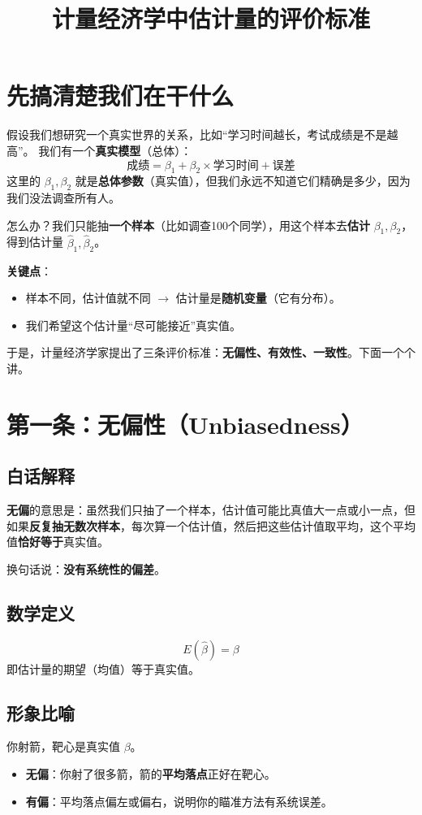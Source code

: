 \documentclass[a4paper,12pt]{article}
\title{计量经济学中估计量的评价标准}
\author{}
\date{}
\begin{document}
\maketitle

\section{先搞清楚我们在干什么}

假设我们想研究一个真实世界的关系，比如“学习时间越长，考试成绩是不是越高”。  
我们有一个\textbf{真实模型}（总体）：
\[
\text{成绩} = \beta_1 + \beta_2 \times \text{学习时间} + \text{误差}
\]
这里的 \(\beta_1, \beta_2\) 就是\textbf{总体参数}（真实值），但我们永远不知道它们精确是多少，因为我们没法调查所有人。

怎么办？我们只能抽\textbf{一个样本}（比如调查100个同学），用这个样本去\textbf{估计} \(\beta_1, \beta_2\)，得到估计量 \(\hat{\beta}_1, \hat{\beta}_2\)。

\textbf{关键点}：  
\begin{itemize}
    \item 样本不同，估计值就不同 $\rightarrow$ 估计量是\textbf{随机变量}（它有分布）。  
    \item 我们希望这个估计量“尽可能接近”真实值。
\end{itemize}

于是，计量经济学家提出了三条评价标准：\textbf{无偏性、有效性、一致性}。下面一个个讲。

\section{第一条：无偏性（Unbiasedness）}

\subsection*{白话解释}
\textbf{无偏}的意思是：虽然我们只抽了一个样本，估计值可能比真值大一点或小一点，但如果\textbf{反复抽无数次样本}，每次算一个估计值，然后把这些估计值取平均，这个平均值\textbf{恰好等于}真实值。

换句话说：\textbf{没有系统性的偏差}。

\subsection*{数学定义}
\[
E(\hat{\beta}) = \beta
\]
即估计量的期望（均值）等于真实值。

\subsection*{形象比喻}
你射箭，靶心是真实值 \(\beta\)。  
\begin{itemize}
    \item \textbf{无偏}：你射了很多箭，箭的\textbf{平均落点}正好在靶心。  
    \item \textbf{有偏}：平均落点偏左或偏右，说明你的瞄准方法有系统误差。
\end{itemize}
\end{document}
